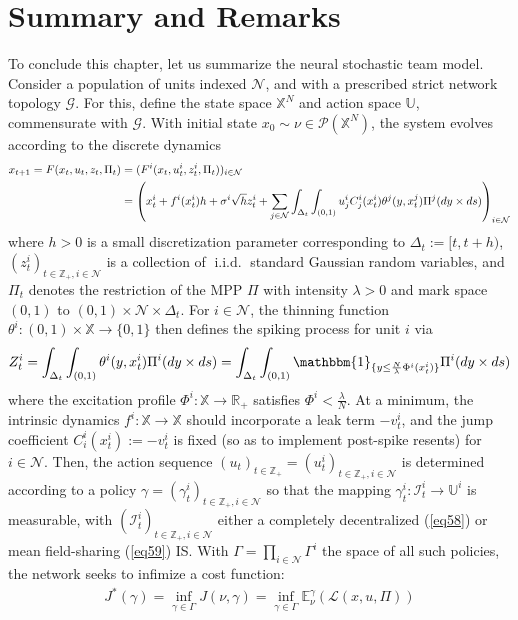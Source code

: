 \documentclass[12pt, oneside]{report}
\newcommand{\E}{\mathbb{E}}
\newcommand{\mbb}[1]{\mathbb{#1}}
\newcommand{\1}[1]{\mathbbm{1}_{\{#1\}}}
\newcommand{\mc}[1]{\mathcal{#1}}
\DeclareMathOperator{\iid}{i.i.d.}
\theoremstyle{definition}
\begin{document}
\section{Summary and Remarks}
To conclude this chapter, let us summarize the neural stochastic team model.
Consider a population of units indexed $\mc{N}$, and with a prescribed strict
network topology $\mc{G}$. For this, define the state space $\mbb{X}^{N}$ and
action space $\mbb{U}$, commensurate with $\mc{G}$. With initial state $x_0\sim
\nu\in\mc{P}(\mbb{X}^N)$, the system evolves according to the discrete dynamics
\begin{align}
    x_{t+1}=F(x_t,u_t,z_t,\Pi_t)&=(F^i(x_t,u^i_t,z^i_t,\Pi_t))_{i\in\mc{N}}\notag\\
    &=\left(x^i_t+f^i(x^i_t)h+\sigma^i\sqrt{h}z^i_t+\sum_{j\in\mc{N}}\int_{\Delta_t}\int_{(0,1)}u^i_jC^i_j(x^i_t)\theta^j(y,x^j_t)\Pi^j(dy\times ds)\right)_{i\in\mc{N}}
\end{align}
where $h>0$ is a small discretization parameter corresponding to
$\Delta_t:=[t,t+h)$, $(z^i_t)_{t\in\mbb{Z}_+,i\in\mc{N}}$ is a collection of
$\iid$ standard Gaussian random variables, and $\Pi_t$ denotes the restriction
of the MPP $\Pi$ with intensity $\lambda>0$ and mark space $(0,1)$ to
$(0,1)\times\mc{N}\times\Delta_t$. For $i\in\mc{N}$, the thinning function
$\theta^i:(0,1)\times\mbb{X}\rightarrow\{0,1\}$ then defines the spiking process
for unit $i$ via 
\begin{align}
    Z^i_t=\int_{\Delta_t}\int_{(0,1)}\theta^i(y,x^i_t)\Pi^i(dy\times ds)=\int_{\Delta_t}\int_{(0,1)}\1{y\leq\frac{N}{\lambda}\Phi^i(x^i_t)}\Pi^i(dy\times ds)
\end{align}
where the excitation profile $\Phi^i:\mbb{X}\rightarrow \mbb{R}_+$ satisfies
$\Phi^i<\frac{\lambda}{N}$. At a minimum, the intrinsic dynamics
$f^i:\mbb{X}\rightarrow\mbb{X}$ should incorporate a leak term $-v^i_t$, and the
jump coefficient $C^i_i(x^i_t):=-v^i_t$ is fixed (so as to implement post-spike
resents) for $i\in\mc{N}$. Then, the action sequence
$(u_t)_{t\in\mbb{Z}_+}=(u^i_t)_{t\in\mbb{Z}_+,i\in\mc{N}}$ is determined
according to a policy $\gamma=(\gamma^i_t)_{t\in\mbb{Z}_+,i\in\mc{N}}$ so that
the mapping $\gamma^i_t:\mc{I}^i_t\rightarrow\mbb{U}^i$ is measurable, with
$(\mc{I}^i_t)_{t\in\mbb{Z}_+,i\in\mc{N}}$ either a completely decentralized
(\ref{eq58}) or mean field-sharing (\ref{eq59}) IS. With
$\Gamma=\prod_{i\in\mc{N}}\Gamma^i$ the space of all such policies, the network
seeks to infimize a cost function:
\begin{align}
    J^\ast(\gamma)=\inf_{\gamma\in\Gamma}J(\nu,\gamma)=\inf_{\gamma\in\Gamma}\E^\gamma_\nu\left(\mc{L}(x,u,\Pi)\right)
\end{align}
\end{document}
